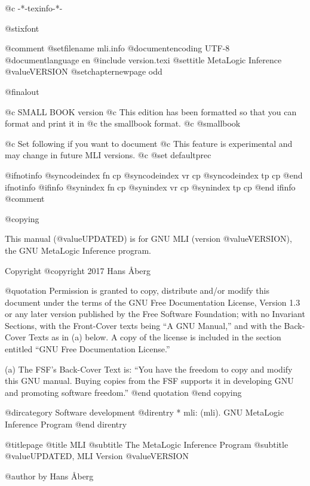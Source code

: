 


 @c -*-texinfo-*-

@stixfont

@comment %
@setfilename mli.info
@documentencoding UTF-8
@documentlanguage en
@include version.texi
@settitle MetaLogic Inference @value{VERSION}
@setchapternewpage odd

@finalout

@c SMALL BOOK version
@c This edition has been formatted so that you can format and print it in
@c the smallbook format.
@c @smallbook

@c Set following if you want to document %
@c This feature is experimental and may change in future MLI versions.
@c @set defaultprec

@ifnotinfo
@syncodeindex fn cp
@syncodeindex vr cp
@syncodeindex tp cp
@end ifnotinfo
@ifinfo
@synindex fn cp
@synindex vr cp
@synindex tp cp
@end ifinfo
@comment %

@copying

This manual (@value{UPDATED}) is for GNU MLI (version
@value{VERSION}), the GNU MetaLogic Inference program.

Copyright @copyright{} 2017 Hans Åberg

@quotation
Permission is granted to copy, distribute and/or modify this document
under the terms of the GNU Free Documentation License,
Version 1.3 or any later version published by the Free Software
Foundation; with no Invariant Sections, with the Front-Cover texts
being ``A GNU Manual,'' and with the Back-Cover Texts as in
(a) below.  A copy of the license is included in the section entitled
``GNU Free Documentation License.''

(a) The FSF's Back-Cover Text is: ``You have the freedom to copy and
modify this GNU manual.  Buying copies from the FSF
supports it in developing GNU and promoting software
freedom.''
@end quotation
@end copying

@dircategory Software development
@direntry
* mli: (mli).       GNU MetaLogic Inference Program
@end direntry

@titlepage
@title MLI
@subtitle The MetaLogic Inference Program
@subtitle @value{UPDATED}, MLI Version @value{VERSION}

@author by Hans Åberg

